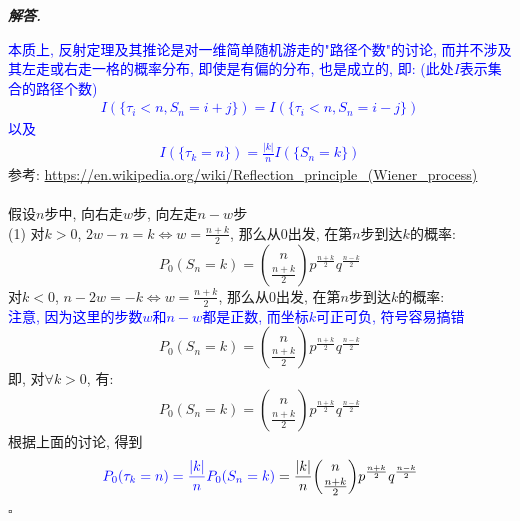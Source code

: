 \documentclass[10pt, a4paper, oneside]{ctexart}
\newenvironment{solution}{%
  \par\noindent\textbf{\textit{解答. }}\ignorespaces
}{%
  \hfill\ensuremath{\square}\par %
}
\begin{document}
\begin{solution}
\textcolor{blue}{本质上, 反射定理及其推论是对一维简单随机游走的"路径个数"的讨论, 而并不涉及其左走或右走一格的概率分布, 即使是有偏的分布, 也是成立的, 即: (此处$I$表示集合的路径个数)
\begin{align*}
    I(\{\tau_i<n, S_{n}=i+j\})=I(\{\tau_i<n, S_{n}=i-j\})
\end{align*}
以及
\begin{align*}
    I(\{\tau_k=n\})=\frac{|k|}{n}I(\{S_{n}=k\})
\end{align*}
}
参考: \url{https://en.wikipedia.org/wiki/Reflection_principle_(Wiener_process)}
\\
\\假设$n$步中, 向右走$w$步, 向左走$n-w$步\\
(1) 对$k>0$, $2w-n=k\iff w=\frac{n+k}{2}$, 那么从$0$出发, 在第$n$步到达$k$的概率:
$$P_0(S_n=k)= {n\choose \frac{n+k}{2}}p^{\frac{n+k}{2}}q^{\frac{n-k}{2}}$$
对$k<0$, $n-2w=-k\iff w=\frac{n+k}{2}$, 那么从$0$出发, 在第$n$步到达$k$的概率:\\
\textcolor{blue}{注意, 因为这里的步数$w$和$n-w$都是正数, 而坐标$k$可正可负, 符号容易搞错}
$$P_0(S_n=k)= {n\choose \frac{n+k}{2}}p^{\frac{n+k}{2}}q^{\frac{n-k}{2}}$$
即, 对$\forall k>0$, 有:
$$P_0(S_n=k)= {n\choose \frac{n+k}{2}}p^{\frac{n+k}{2}}q^{\frac{n-k}{2}}$$
根据上面的讨论, 得到
$$\textcolor{blue}{P_0(\tau_k=n)=\frac{|k|}{n}P_0(S_n=k)}=\frac{|k|}{n}{n\choose \frac{n+k}{2}}p^{\frac{n+k}{2}}q^{\frac{n-k}{2}}$$


\end{solution}
\end{document}
